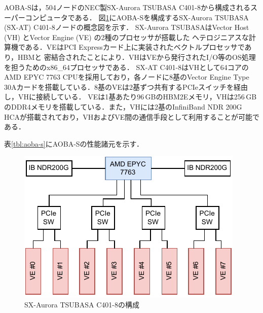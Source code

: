 ﻿\documentclass[submit,techrep,noauthor]{ipsj}
\begin{document}
AOBA-Sは，504ノードのNEC製SX-Aurora TSUBASA C401-8から構成されるスーパーコンピュータである．
図\ref{fig:node}にAOBA-Sを構成するSX-Aurora TSUBASA (SX-AT) C401-8ノードの概念図を示す．
SX-Aurora TSUBASAはVector Host (VH) とVector Engine (VE) の2種のプロセッサが搭載した
ヘテロジニアスな計算機である．VEはPCI Expressカード上に実装されたベクトルプロセッサであり，HBMと
密結合されたことにより．VHはVEから発行されたI/O等のOS処理を担うためのx86\_64プロセッサである．
SX-AT C401-8はVHとして64コアのAMD EPYC 7763 CPUを採用しており，各ノードに8基のVector Engine Type
30Aカードを搭載している．8基のVEは2基ずつ共有するPCIeスイッチを経由し，VHに接続している．
VEは1基あたり96\,GBのHBM2Eメモリ，VHは256\,GBのDDR4メモリを搭載している．また，VHには2基のInfiniBand
NDR 200G HCAが搭載されており，VHおよびVE間の通信手段として利用することが可能である．

表\ref{tbl:aoba-s}にAOBA-Sの性能諸元を示す．

\begin{figure}[tb]
  \centering
  \includegraphics{figs/node_arch.pdf}
  \caption{SX-Aurora TSUBASA C401-8の構成}\label{fig:node}
\end{figure}
\end{document}
